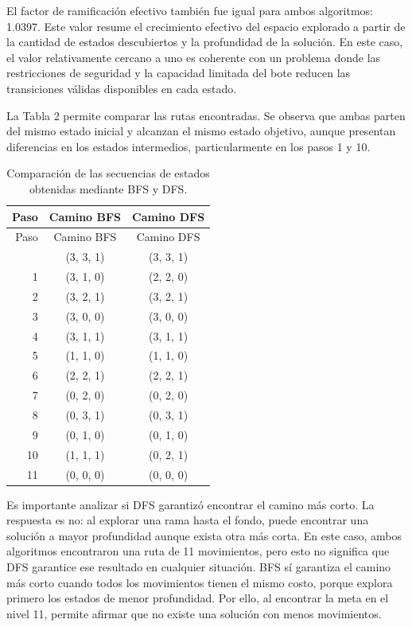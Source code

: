 \documentclass[
  spanish,
  11pt,
]{article}
\begin{document}
El factor de ramificación efectivo también fue igual para ambos
algoritmos: 1.0397. Este valor resume el crecimiento efectivo del
espacio explorado a partir de la cantidad de estados descubiertos y la
profundidad de la solución. En este caso, el valor relativamente cercano
a uno es coherente con un problema donde las restricciones de seguridad
y la capacidad limitada del bote reducen las transiciones válidas
disponibles en cada estado.

La Tabla 2 permite comparar las rutas encontradas. Se observa que ambas
parten del mismo estado inicial y alcanzan el mismo estado objetivo,
aunque presentan diferencias en los estados intermedios, particularmente
en los pasos 1 y 10.

\begin{longtable}[]{@{}rcc@{}}
\caption{Comparación de las secuencias de estados obtenidas mediante BFS
y DFS.}\label{tbl-caminos}\tabularnewline
\toprule\noalign{}
Paso & Camino BFS & Camino DFS \\
\midrule\noalign{}
\endfirsthead
\toprule\noalign{}
Paso & Camino BFS & Camino DFS \\
\midrule\noalign{}
\endhead
\bottomrule\noalign{}
\endlastfoot
0 & (3, 3, 1) & (3, 3, 1) \\
1 & (3, 1, 0) & (2, 2, 0) \\
2 & (3, 2, 1) & (3, 2, 1) \\
3 & (3, 0, 0) & (3, 0, 0) \\
4 & (3, 1, 1) & (3, 1, 1) \\
5 & (1, 1, 0) & (1, 1, 0) \\
6 & (2, 2, 1) & (2, 2, 1) \\
7 & (0, 2, 0) & (0, 2, 0) \\
8 & (0, 3, 1) & (0, 3, 1) \\
9 & (0, 1, 0) & (0, 1, 0) \\
10 & (1, 1, 1) & (0, 2, 1) \\
11 & (0, 0, 0) & (0, 0, 0) \\
\end{longtable}

Es importante analizar si DFS garantizó encontrar el camino más corto.
La respuesta es no: al explorar una rama hasta el fondo, puede encontrar
una solución a mayor profundidad aunque exista otra más corta. En este
caso, ambos algoritmos encontraron una ruta de 11 movimientos, pero esto
no significa que DFS garantice ese resultado en cualquier situación. BFS
sí garantiza el camino más corto cuando todos los movimientos tienen el
mismo costo, porque explora primero los estados de menor profundidad.
Por ello, al encontrar la meta en el nivel 11, permite afirmar que no
existe una solución con menos movimientos.
\end{document}
